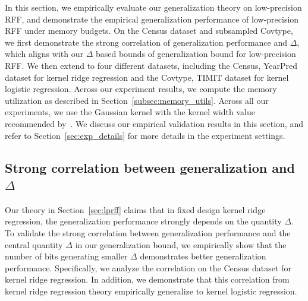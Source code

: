In this section, we empirically evaluate our generalization theory on low-precision RFF, and demonstrate the empirical generalization performance of low-precision RFF under memory budgets. On the Census dataset and subsampled Covtype, we first demonstrate the strong correlation of generalization performance and $\Delta$, which aligns with our $\Delta$ based bounds of generalization bound for low-precision RFF. We then extend to four different datasets, including the Census, YearPred dataset for kernel ridge regression and the Covtype, TIMIT dataset for kernel logistic regression. Across our experiment results, we compute the memory utilization as described in Section~\ref{subsec:memory_utils}. Across all our experiments, we use the Gaussian kernel with the kernel width value recommended by~\citet{may2017kernel}. We discuss our empirical validation results in this section, and refer to Section~\ref{sec:exp_details} for more details in the experiment settings.

\subsection{Strong correlation between generalization and $\Delta$}
Our theory in Section~\ref{sec:lprff} claims that in fixed design kernel ridge regression, the generalization performance strongly depends on the quantity $\Delta$.
To validate the strong correlation between generalization performance and the central quantity $\Delta$ in our generalization bound, we empirically show that the number of bits generating smaller $\Delta$ demonstrates better generalization performance. 
Specifically, we analyze the correlation on the Census dataset for kernel ridge regression. In addition, we demonstrate that this correlation from kernel ridge regression theory empirically generalize to kernel logistic regression. 

